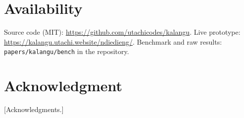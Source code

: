 \documentclass[conference]{IEEEtran}
\begin{document}
\section*{Availability}
Source code (MIT): \url{https://github.com/utachicodes/kalangu}. Live
prototype: \url{https://kalangu.utachi.website/ndiedieng/}. Benchmark and raw
results: \texttt{papers/kalangu/bench} in the repository.

\section*{Acknowledgment}
[Acknowledgments.]



\end{document}
